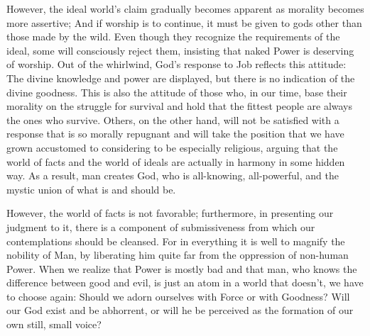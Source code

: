 \documentclass[a4paper,12pt]{book}[2004/02/16]
\theoremstyle{ilemma}
\theoremstyle{itheorem}
\theoremstyle{iother}
\theoremstyle{icorollary}
\theoremstyle{numcorollary}
\theoremstyle{idefinition}
\begin{document}
However, the ideal world's claim gradually becomes apparent as morality becomes more assertive; And if worship is to continue, it must be given to gods other than those made by the wild. Even though they recognize the requirements of the ideal, some will consciously reject them, insisting that naked Power is deserving of worship. Out of the whirlwind, God's response to Job reflects this attitude: The divine knowledge and power are displayed, but there is no indication of the divine goodness. This is also the attitude of those who, in our time, base their morality on the struggle for survival and hold that the fittest people are always the ones who survive. Others, on the other hand, will not be satisfied with a response that is so morally repugnant and will take the position that we have grown accustomed to considering to be especially religious, arguing that the world of facts and the world of ideals are actually in harmony in some hidden way. As a result, man creates God, who is all-knowing, all-powerful, and the mystic union of what is and should be.

However, the world of facts is not favorable; furthermore, in presenting our
judgment to it, there is a component of submissiveness from which our
contemplations should be cleansed. For in everything it is well to magnify the
nobility of Man, by liberating him quite far from the oppression of
non-human Power. When we realize that Power is mostly bad and that man, who knows the difference between good and evil, is just an atom in a world that doesn't, we have to choose again: Should we adorn ourselves with Force or with Goodness? Will our
God exist and be abhorrent, or will he be perceived as the formation of
our own still, small voice?
\end{document}
